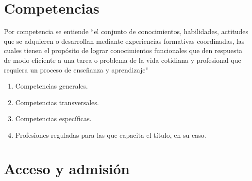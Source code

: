 \section{Competencias}

Por competencia se entiende ``el conjunto de conocimientos, habilidades,
actitudes que se adquieren o desarrollan mediante experiencias formativas
coordinadas, las cuales tienen el propósito de lograr conocimientos
funcionales que den respuesta de modo eficiente a una tarea o problema de la
vida cotidiana y profesional que requiera un proceso de enseñanza y
aprendizaje''%

\begin{enumerate}

    \item Competencias generales.

    \item Competencias transversales.

    \item Competencias específicas.

    \item Profesiones reguladas para las que capacita el título, en su caso.

\end{enumerate}

\section{Acceso y admisión}


